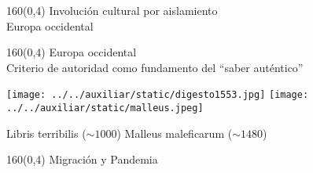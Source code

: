 \documentclass[shownotes,aspectratio=169]{beamer}
\begin{document}
\begin{frame}[plain]
\begin{textblock}{160}(0,4)
\centering \LARGE  \textcolor{black!85}{Involución cultural por aislamiento} \\
\Large Europa occidental

\end{textblock}


\end{frame}


\begin{frame}[plain]
\begin{textblock}{160}(0,4)
\centering \LARGE  \textcolor{black!85}{Europa occidental} \\ 
\Large Criterio de autoridad como fundamento del ``saber auténtico''
\end{textblock}
\vspace{2cm}

\centering

\texttt{[image: ../../auxiliar/static/digesto1553.jpg]}
\hspace{0.8cm}
\texttt{[image: ../../auxiliar/static/malleus.jpeg]}

\hspace{0.2cm} Libris terribilis ($\sim 1000$) \hspace{0.2cm} Malleus maleficarum ($\sim 1480$)

\end{frame}


\begin{frame}[plain]
\begin{textblock}{160}(0,4)
\centering \LARGE  \textcolor{black!85}{Migración y Pandemia} \\ 
\end{textblock}
\vspace{2cm}

\centering


\end{frame}
\end{document}
